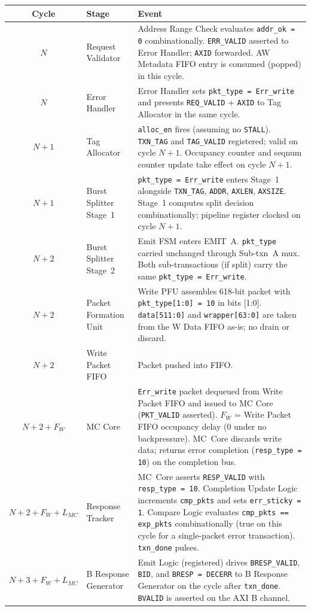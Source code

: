 \documentclass[11pt,a4paper]{article}
\begin{document}
\begin{center}
\begin{tabular}{clL{9cm}}
\toprule
\textbf{Cycle} & \textbf{Stage} & \textbf{Event} \\
\midrule
$N$   & Request Validator & Address Range Check evaluates \texttt{addr\_ok = 0} combinationally. \texttt{ERR\_VALID} asserted to Error Handler; \texttt{AXID} forwarded. AW Metadata FIFO entry is consumed (popped) in this cycle. \\
$N$   & Error Handler     & Error Handler sets \texttt{pkt\_type = Err\_write} and presents \texttt{REQ\_VALID} + \texttt{AXID} to Tag Allocator in the same cycle. \\
$N+1$ & Tag Allocator     & \texttt{alloc\_en} fires (assuming no \texttt{STALL}). \texttt{TXN\_TAG} and \texttt{TAG\_VALID} registered; valid on cycle $N+1$. Occupancy counter and seqnum counter update take effect on cycle $N+1$. \\
$N+1$ & Burst Splitter Stage~1 & \texttt{pkt\_type = Err\_write} enters Stage~1 alongside \texttt{TXN\_TAG}, \texttt{ADDR}, \texttt{AXLEN}, \texttt{AXSIZE}. Stage~1 computes split decision combinationally; pipeline register clocked on cycle $N+1$. \\
$N+2$ & Burst Splitter Stage~2 & Emit FSM enters \textsc{EMIT~A}. \texttt{pkt\_type} carried unchanged through Sub-txn~A mux. Both sub-transactions (if split) carry the same \texttt{pkt\_type = Err\_write}. \\
$N+2$ & Packet Formation Unit & Write PFU assembles 618-bit packet with \texttt{pkt\_type[1:0] = 10} in bits [1:0]. \texttt{data[511:0]} and \texttt{wrapper[63:0]} are taken from the W Data FIFO as-is; no drain or discard. \\
$N+2$ & Write Packet FIFO & Packet pushed into FIFO. \\
$N+2 + F_W$ & MC Core & \texttt{Err\_write} packet dequeued from Write Packet FIFO and issued to MC Core (\texttt{PKT\_VALID} asserted). $F_W$ = Write Packet FIFO occupancy delay (0 under no backpressure). MC~Core discards write data; returns error completion (\texttt{resp\_type = 10}) on the completion bus. \\
$N+2 + F_W + L_{MC}$ & Response Tracker & MC~Core asserts \texttt{RESP\_VALID} with \texttt{resp\_type = 10}. Completion Update Logic increments \texttt{cmp\_pkts} and sets \texttt{err\_sticky = 1}. Compare Logic evaluates \texttt{cmp\_pkts == exp\_pkts} combinationally (true on this cycle for a single-packet error transaction). \texttt{txn\_done} pulses. \\
$N+3 + F_W + L_{MC}$ & B Response Generator & Emit Logic (registered) drives \texttt{BRESP\_VALID}, \texttt{BID}, and \texttt{BRESP = DECERR} to B Response Generator on the cycle after \texttt{txn\_done}. \texttt{BVALID} is asserted on the AXI B channel. \\
\bottomrule
\end{tabular}
\end{center}
\end{document}
